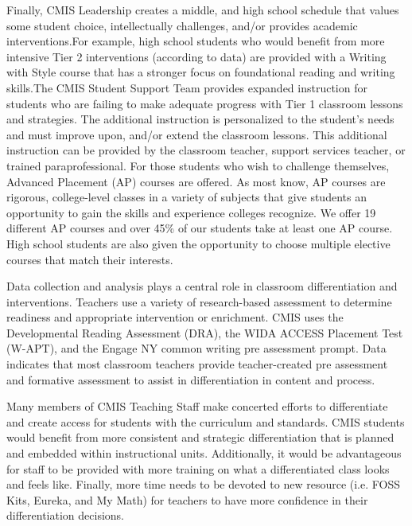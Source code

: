 \documentclass{report}
\begin{document}
\begin{findings}
Finally, CMIS Leadership creates a middle, and high school schedule that values some student choice, intellectually challenges, and/or provides academic interventions.For example, high school students who would benefit from more intensive Tier 2 interventions (according to data) are provided with a Writing with Style course that has a stronger focus on foundational reading and writing skills.The CMIS Student Support Team provides expanded instruction for students who are failing to make adequate progress with Tier 1 classroom lessons and strategies. The additional instruction is personalized to the student’s needs and must improve upon, and/or extend the classroom lessons. This additional instruction can be provided by the classroom teacher, support services teacher, or trained paraprofessional. For those students who wish to challenge themselves, Advanced Placement (AP) courses are offered. As most know, AP courses are rigorous, college-level classes in a variety of subjects that give students an opportunity to gain the skills and experience colleges recognize. We offer 19 different AP courses and over 45\% of our students take at least one AP course. High school students are also given the opportunity to choose multiple elective courses that match their interests. 

 
Data collection and analysis plays a central role in classroom differentiation and interventions. Teachers use a variety of research-based assessment to determine readiness and appropriate intervention or enrichment. CMIS uses the Developmental Reading Assessment (DRA), the WIDA ACCESS Placement Test (W-APT), and the Engage NY common writing pre assessment prompt. Data indicates that most classroom teachers provide teacher-created pre assessment and formative assessment to assist in differentiation in content and process. 


Many members of CMIS Teaching Staff make concerted efforts to differentiate and create access for students with the curriculum and standards. CMIS students would benefit from more consistent and strategic differentiation that is planned and embedded within instructional units. Additionally, it would be advantageous for staff to be provided with more training on what a differentiated class looks and feels like. Finally, more time needs to be devoted to new resource (i.e. FOSS Kits, Eureka, and My Math) for teachers to have more confidence in their differentiation decisions. 
\end{findings}
\end{document}

